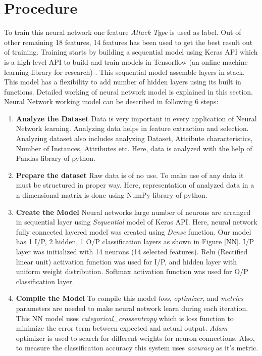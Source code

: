\section{Procedure} \label{Procedure}
 To train this neural network one feature \textit{Attack Type} is used as label. Out of other remaining 18 features, 14 features has been used to get the best result out of training. Training starts by building a sequential model using Keras API which is a high-level API to build and train models in Tensorflow (an online machine learning library for research) . This sequential model assemble layers in stack. This model has a flexibility to add number of hidden layers using its built in functions. Detailed working of neural network model is explained in this section.
Neural Network working model can be described in following 6 steps:
\begin{enumerate}[label=\textbf{\roman*}.]
\item \textbf{Analyze the Dataset } Data is very important in every application of Neural Network learning. Analyzing data helps in feature extraction and selection. Analyzing dataset also includes analyzing Dataset, Attribute characteristics, Number of Instances, Attributes etc. Here, data is analyzed with the help of Pandas library of python. 
\item \textbf{Prepare the dataset } Raw data is of no use. To make use of any data it must be structured in proper way. Here, representation of analyzed data in a n-dimensional matrix is done using NumPy library of python.

\item \textbf{Create the Model } Neural networks large number of neurons are arranged in sequential layer using \textit{Sequential} model of Keras API. Here, neural network fully connected layered model was created using \textit{Dense} function. Our model has 1 I/P, 2 hidden, 1 O/P classification layers as shown in Figure \ref{NN}. I/P layer was initialized with 14 neurons (14 selected features). Relu (Rectified linear unit) activation function was used for I/P, and hidden layer with uniform weight distribution. Softmax activation function was used for O/P classification layer.

\item \textbf{Compile the Model } To compile this model \textit{loss}, \textit{optimizer}, and \textit{metrics} parameters are needed to make neural network learn during each iteration. This NN model uses \textit{categorical\_crossentropy} which is loss function to minimize the error term between expected and actual output. \textit{Adam} optimizer is used to search for different weights for neuron connections. Also, to measure the classification accuracy this system uses \textit{accuracy} as it's metric. 


\end{enumerate}
